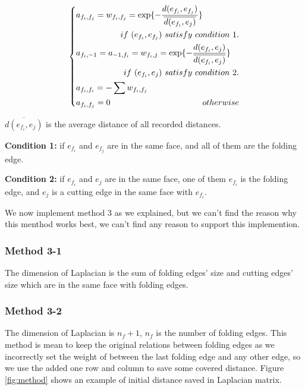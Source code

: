\begin{equation}
\left\{
\begin{gathered}
a_{{f_i},{f_j}} = w_{{f_i},{f_j}} = \exp\{-\frac{d(e_{f_i},e_{f_j})}{\overline{d(e_{f_i},e_j)}}\} \quad \hfill \\ \quad  \hfill if~(e_{f_i},e_{f_j})~satisfy~condition~1. \\
a_{{f_i},-1} = a_{-1,{f_i}} =  w_{{f_i},j} = \exp\{-\frac{d(e_{f_i},e_j)}{\overline{d(e_{f_i},e_{j})}}\} \quad \hfill \\ \quad  \hfill if~(e_{f_i},e_j)~satisfy~condition~2.\\
a_{{f_i},f_i} = -\sum w_{{f_i},{f_j}} \quad \hfill \\
a_{{f_i},{f_j}} = 0 \quad \hfill otherwise \\
\end{gathered}
\right.
\end{equation}


$\overline{d(e_{f_i},e_j)}$ is the average distance of all recorded distances.  

\textbf{Condition 1:} if $e_{f_i}$ and  $e_{f_j}$ are in the same face, and all of them are the folding edge.

\textbf{Condition 2:} if $e_{f_i}$ and  $e_{j}$ are in the same face, one of them $e_{f_i}$ is the folding edge, and $e_j$ is a cutting edge in the same face with $e_{f_i}$.

We now implement method 3 as we explained, but we can't find the reason why this menthod works best, we can't find any reason to support this implemention.

\subsubsection{Method 3-1}
The dimension of Laplacian is the sum of folding edges' size and cutting edges' size which are in the same face with folding edges. 

\subsubsection{Method 3-2}
The dimension of Laplacian is $n_f + 1$, $n_f$ is the number of folding edges. This method is mean to keep the original relations between folding edges as we incorrectly set the weight of between the last folding edge and any other edge, so we use the added one row and column to save some covered distance. Figure \ref{fig:method} shows an example of initial distance saved in Laplacian matrix.

